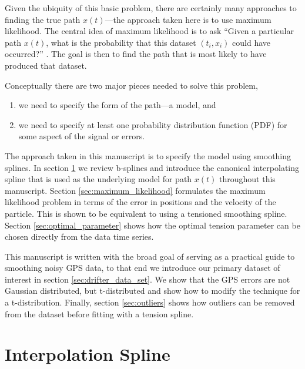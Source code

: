 \documentclass[10pt,journal]{IEEEtran}
\begin{document}
Given the ubiquity of this basic problem, there are certainly many approaches to finding the true path $x(t)$---the approach taken here is to use maximum likelihood. The central idea of maximum likelihood is to ask ``Given a particular path $x(t)$, what is the probability that this dataset $(t_i,x_i)$ could have occurred?'' \cite{press1992-book}. The goal is then to find the path that is most likely to have produced that dataset.

Conceptually there are two major pieces needed to solve this problem,
\begin{enumerate}
\item we need to specify the form of the path---a model, and
\item we need to specify at least one probability distribution function (PDF) for some aspect of the signal or errors.
\end{enumerate}

The approach taken in this manuscript is to specify the model using smoothing splines. In section \ref{sec:interpolation} we review b-splines and introduce the canonical interpolating spline that is used as the underlying model for path $x(t)$ throughout this manuscript. Section \ref{sec:maximum_likelihood} formulates the maximum likelihood problem in terms of the error in positions and the velocity of the particle. This is shown to be equivalent to using a tensioned smoothing spline. Section \ref{sec:optimal_parameter} shows how the optimal tension parameter can be chosen directly from the data time series.

This manuscript is written with the broad goal of serving as a practical guide to smoothing noisy GPS data, to that end we introduce our primary dataset of interest in section \ref{sec:drifter_data_set}. We show that the GPS errors are not Gaussian distributed, but t-distributed and show how to modify the technique for a t-distribution. Finally, section \ref{sec:outliers} shows how outliers can be removed from the dataset before fitting with a tension spline.

%
\section{Interpolation Spline}
\label{sec:interpolation}
%
\end{document}
